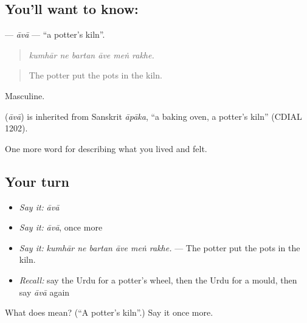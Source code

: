 \subsection*{You'll want to know: }
\textbf{} — \emph{āvā} — \textquotedblleft{}a potter's kiln\textquotedblright{}.

\begin{quote}
     
\end{quote}

\begin{quote}
\emph{kumhār ne bartan āve meṅ rakhe.}
\end{quote}

\begin{quote}
The potter put the pots in the kiln.
\end{quote}

Masculine.

\begin{cousinweb}
\textbf{} (\emph{āvā}) is inherited from Sanskrit \emph{āpāka}, \textquotedblleft{}a baking oven, a potter's kiln\textquotedblright{} (CDIAL 1202).
\end{cousinweb}

\begin{grammarlens}[title={What you've built}]
One more word for describing what you lived and felt.
\end{grammarlens}

\subsection*{Your turn}
\begin{itemize}
\raggedright
  \item \emph{Say it:} \emph{āvā}
  \item \emph{Say it:} \emph{āvā}, once more
  \item \emph{Say it:} \emph{kumhār ne bartan āve meṅ rakhe.} — The potter put the pots in the kiln.
  \item \emph{Recall:} say the Urdu for a potter's wheel, then the Urdu for a mould, then say \emph{āvā} again
\end{itemize}

\begin{tcolorbox}[breakable,colback=teal!4,colframe=teal!35!black,title={Before you move on}]
What does  mean? (\textquotedblleft{}A potter's kiln\textquotedblright{}.) Say it once more.
\end{tcolorbox}
